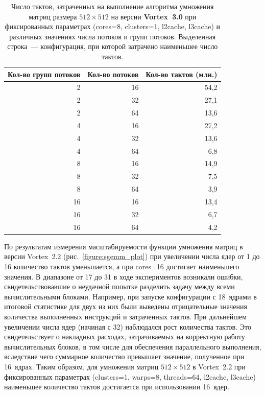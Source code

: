 \documentclass[a4paper]{article}
\begin{document}
\begin{table}[p]
    \centering
    \caption{\label{tab:optimal_for_8_v3_0} Число тактов, затраченных на выполнение алгоритма умножения матриц размера $512\times512$ на версии \textbf{Vortex~3.0} при фиксированных параметрах (cores=8, clusters=1, l2cache, l3cache) и различных значениях числа потоков и групп потоков. Выделенная строка~--- конфигурация, при которой затрачено наименьшее число тактов.}
    \begin{tabular}{r r r}
        \hline
        \multicolumn{1}{c}{Кол-во групп потоков} & \multicolumn{1}{c}{Кол-во потоков} & \multicolumn{1}{c}{Кол-во тактов (млн.)} \\ \hline
        2 & 16 & 54,2 \\ \hline
        2 & 32 & 27,1 \\ \hline
        2 & 64 & 13,6 \\ \hline

        4 & 16 & 27,2 \\ \hline
        4 & 32 & 13,6 \\ \hline
        4 & 64 & 6,8 \\ \hline

        8 & 16 & 14,9 \\ \hline
        8 & 32 & 7,5 \\ \hline
        \rowcolor{lightgray}
        8 & 64 & 3,9 \\ \hline

        16 & 16 & 13,4 \\ \hline
        16 & 32 & 6,7 \\ \hline
        16 & 64 & 4,2 \\ \hline
    \end{tabular}
\end{table}

По результатам измерения масштабируемости функции умножения матриц в версии Vortex~2.2 (рис.~\ref{figure:sgemm_plot}) при увеличении числа ядер от 1 до 16 количество тактов уменьшается, а при cores=16 достигает наименьшего значения. В диапазоне от 17 до 31 в ходе экспериментов возникали ошибки, свидетельствовавшие о неудачной попытке разделить задачу между всеми вычислительными блоками. Например, при запуске конфигурации с 18~ядрами в итоговой статистике для двух из них были выведены отрицательные значения количества выполненных инструкций и затраченных тактов. При дальнейшем увеличении числа ядер (начиная с 32) наблюдался рост количества тактов. Это свидетельствует о накладных расходах, затрачиваемых на корректную работу вычислительных блоков, в том числе для обеспечения параллельного выполнения, вследствие чего суммарное количество превышает значение, полученное при 16~ядрах. Таким образом, для умножения матриц $512\times512$ в Vortex~2.2 при фиксированных параметрах (clusters=1, warps=8, threads=64, l2cache, l3cache) наименьшее количество тактов достигается при использовании 16~ядер.
\end{document}

